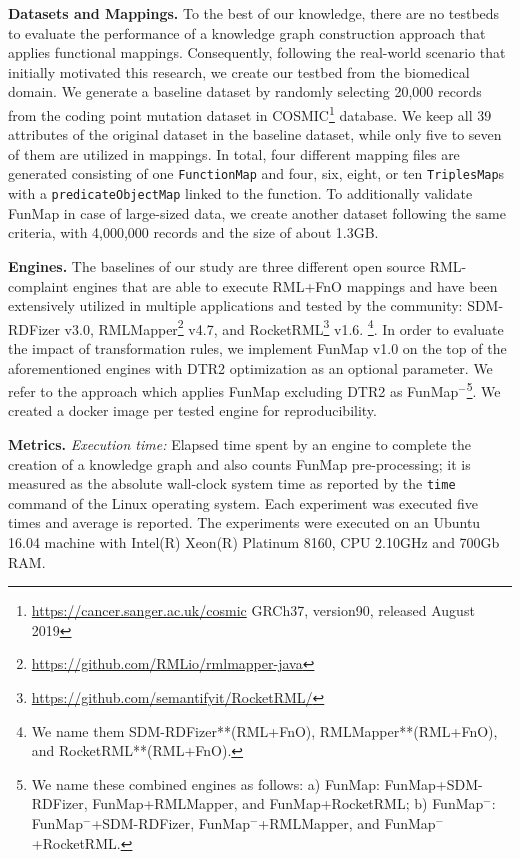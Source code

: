 \noindent\textbf{Datasets and Mappings.}
To the best of our knowledge, there are no testbeds to evaluate the performance of a knowledge graph construction approach that applies functional mappings. Consequently, following the real-world scenario that initially motivated this research, we create our testbed from the biomedical domain. We generate a baseline dataset by randomly selecting 20,000 records from the coding point mutation dataset in COSMIC\footnote{\url{https://cancer.sanger.ac.uk/cosmic} GRCh37, version90, released August 2019} database. We keep all 39 attributes of the original dataset in the baseline dataset, while only five to seven of them are utilized in mappings. In total, four different mapping files are generated consisting of one \verb|FunctionMap| and four, six, eight, or ten \verb|TriplesMap|s with a \verb|predicateObjectMap| linked to the function. To additionally validate FunMap in case of large-sized data, we create another dataset following the same criteria, with 4,000,000 records and the size of about 1.3GB.

\noindent\textbf{Engines.}
The baselines of our study are three different open source RML-complaint engines that are able to execute RML+FnO mappings and have been extensively utilized in multiple applications and tested by the community: SDM-RDFizer v3.0\citep{iglesias2020sdm}, RMLMapper\footnote{\url{https://github.com/RMLio/rmlmapper-java}} v4.7, and RocketRML\footnote{\url{https://github.com/semantifyit/RocketRML/}} v1.6. \footnote{We name them SDM-RDFizer**(RML+FnO), RMLMapper**(RML+FnO), and RocketRML**(RML+FnO).}. In order to evaluate the impact of transformation rules, we implement FunMap v1.0 on the top of the aforementioned engines with DTR2 optimization as an optional parameter. We refer to the approach which applies FunMap excluding DTR2 as FunMap$^-$\footnote{We name these combined engines as follows: a) FunMap: FunMap+SDM-RDFizer, FunMap+RMLMapper, and FunMap+RocketRML; b) FunMap$^-$: FunMap$^-$+SDM-RDFizer, FunMap$^-$+RMLMapper, and FunMap$^-$+RocketRML.}. We created a docker image per tested engine for reproducibility.  

\noindent\textbf{Metrics.} \textit{Execution time:} Elapsed time spent by an engine to complete the creation of a knowledge graph and also counts FunMap pre-processing; it is measured as the absolute wall-clock system time as reported by the \verb|time| command of the Linux operating system. Each experiment was executed five times and average is reported. The experiments were executed on an Ubuntu 16.04 machine with Intel(R) Xeon(R) Platinum 8160, CPU 2.10GHz and 700Gb RAM. 

